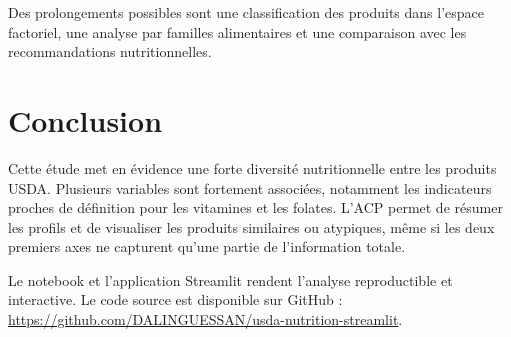 \documentclass[12pt,a4paper]{article}
\begin{document}
Des prolongements possibles sont une classification des produits dans l'espace factoriel, une analyse par familles alimentaires et une comparaison avec les recommandations nutritionnelles.

\section{Conclusion}

Cette étude met en évidence une forte diversité nutritionnelle entre les produits USDA. Plusieurs variables sont fortement associées, notamment les indicateurs proches de définition pour les vitamines et les folates. L'ACP permet de résumer les profils et de visualiser les produits similaires ou atypiques, même si les deux premiers axes ne capturent qu'une partie de l'information totale.

Le notebook et l'application Streamlit rendent l'analyse reproductible et interactive. Le code source est disponible sur GitHub :
\url{https://github.com/DALINGUESSAN/usda-nutrition-streamlit}.
\end{document}
